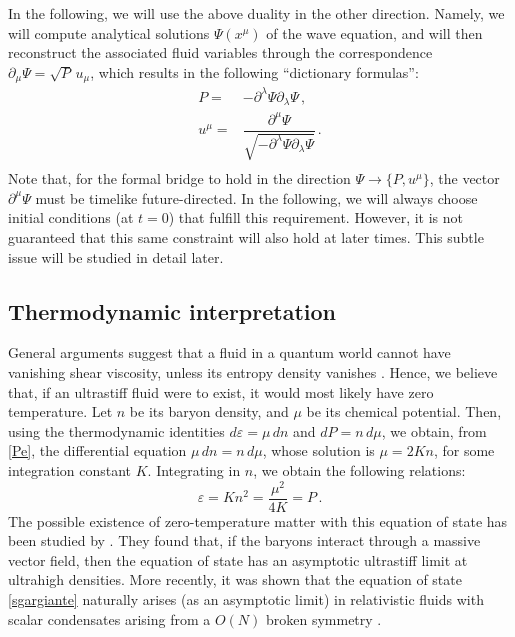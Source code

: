 \documentclass[a4paper, amsfonts, amssymb, amsmath, reprint, showkeys, nofootinbib, twoside,notitlepage,onecolumn]{revtex4-2}
\theoremstyle{definition}
\theoremstyle{theorem}
\theoremstyle{corollary}
\begin{document}
In the following, we will use the above duality in the other direction. Namely, we will compute analytical solutions $\Psi(x^\mu)$ of the wave equation, and will then reconstruct the associated fluid variables through the correspondence $\partial_\mu \Psi=\sqrt{P} \, u_\mu$, which results in the following ``dictionary formulas'':
\begin{equation}
\begin{split}
P ={}& - \partial^\lambda \Psi \partial_\lambda \Psi \, , \\ 
u^\mu ={}& \dfrac{\partial^\mu \Psi}{\sqrt{-\partial^\lambda \Psi \partial_\lambda \Psi}} \, . \\
\end{split}
\end{equation}
Note that, for the formal bridge to hold in the direction $\Psi\rightarrow \{P,u^\mu\}$, the vector $\partial^\mu \Psi$ must be timelike future-directed. In the following, we will always choose initial conditions (at $t=0$) that fulfill this requirement. However, it is not guaranteed that this same constraint will also hold at later times. This subtle issue will be studied in detail later.

\subsection{Thermodynamic interpretation}

General arguments suggest that a fluid in a quantum world cannot have vanishing shear viscosity, unless its entropy density vanishes \cite{Kovtun:2004de}. Hence, we believe that, if an ultrastiff fluid were to exist, it would most likely have zero temperature. Let $n$ be its baryon density, and $\mu$ be its chemical potential. Then, using the thermodynamic identities $d\varepsilon=\mu \, dn$ and $dP=n \, d\mu$, we obtain, from \eqref{Pe}, the differential equation $\mu \, dn = n \, d\mu$, whose solution is $\mu = 2K n$, for some integration constant $K$. Integrating in $n$, we obtain the following relations:
\begin{equation}\label{sgargiante}
    \varepsilon= Kn^2 =\dfrac{\mu^2}{4K} =P \, .
\end{equation}
The possible existence of zero-temperature matter with this equation of state has been studied by \citet{Zeldovich:1961sbr}. They found that, if the baryons interact through a massive vector field, then the equation of state has an asymptotic ultrastiff limit at ultrahigh densities. More recently, it was shown that the equation of state \eqref{sgargiante} naturally arises (as an asymptotic limit) in relativistic fluids with scalar condensates arising from a $O(N)$ broken symmetry \cite{MooreSpeedofSound2024gmt}.
\end{document}
